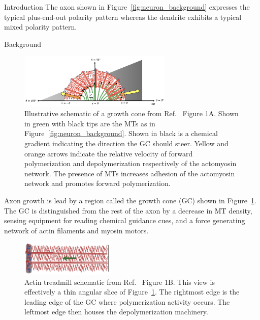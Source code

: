 \documentclass{beamer}
\newlength{\colwidth}
\begin{document}
\begin{frame}[t]
\begin{columns}[t]
\begin{column}{\colwidth}
\begin{block}{Introduction}
The axon shown in Figure~\ref{fig:neuron_background} expresses the typical plus-end-out polarity pattern whereas the dendrite exhibits a typical mixed polarity pattern.

\end{block}

\begin{block}{Background}

\begin{figure}
    \centering
    \includegraphics[width=0.65\textwidth]{figures/introduction/gc_crag_1a.png}
    \caption{\label{fig:gc_craig}
        Illustrative schematic of a growth cone from Ref.~\cite{craig2018fcn} Figure 1A. Shown in green with black tips are the MTs as in Figure~\ref{fig:neuron_background}. Shown in black is a chemical gradient indicating the direction the GC should steer. Yellow and orange arrows indicate the relative velocity of forward polymerization and depolymerization respectively of the actomyosin network. The presence of MTs increases adhesion of the actomyosin network and promotes forward polymerization.
    }
\end{figure}

Axon growth is lead by a region called the growth cone (GC) shown in Figure~\ref{fig:gc_craig}. The GC is distinguished from the rest of the axon by a decrease in MT density, sensing equipment for reading chemical guidance cues, and a force generating network of actin filaments and myosin motors.

\begin{figure}
    \centering
    \includegraphics[width=0.4\textwidth]{figures/introduction/actin_treadmill.png}
    \caption{\label{fig:actin_craig}
        Actin treadmill schematic from Ref.~\cite{craig2012bj} Figure 1B. This view is effectively a thin angular slice of Figure~\ref{fig:gc_craig}. The rightmost edge is the leading edge of the GC where polymerization activity occurs. The leftmost edge then houses the depolymerization machinery.
    }
\end{figure}


\end{block}
\end{column}
\end{columns}
\end{frame}
\end{document}
